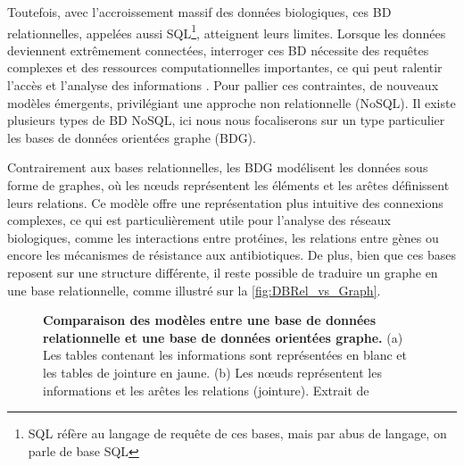 Toutefois, avec l’accroissement massif des données biologiques, ces BD relationnelles, appelées aussi SQL\footnote{SQL réfère au langage de requête de ces bases, mais par abus de langage, on parle de base SQL}, atteignent leurs limites. Lorsque les données deviennent extrêmement connectées, interroger ces BD nécessite des requêtes complexes et des ressources computationnelles importantes, ce qui peut ralentir l’accès et l’analyse des informations \cite{hsu_correlation_2014}. Pour pallier ces contraintes, de nouveaux modèles émergents, privilégiant une approche non relationnelle (NoSQL). Il existe plusieurs types de BD NoSQL, ici nous nous focaliserons sur un type particulier les bases de données orientées graphe (BDG).

Contrairement aux bases relationnelles, les BDG modélisent les données sous forme de graphes, où les n\oe uds représentent les éléments et les arêtes définissent leurs relations. Ce modèle offre une représentation plus intuitive des connexions complexes, ce qui est particulièrement utile pour l’analyse des réseaux biologiques, comme les interactions entre protéines, les relations entre gènes ou encore les mécanismes de résistance aux antibiotiques. De plus, bien que ces bases reposent sur une structure différente, il reste possible de traduire un graphe en une base relationnelle, comme illustré sur la \autoref{fig:DBRel_vs_Graph}.

\begin{figure}[htbp]
    \centering
    \hfill
    \caption[Comparaison des modèles entre une base de données relationnelle et une base de données orientées graphe]{\textbf{Comparaison des modèles entre une base de données relationnelle et une base de données orientées graphe.} (a) Les tables contenant les informations sont représentées en blanc et les tables de jointure en jaune. (b) Les n\oe uds représentent les informations et les arêtes les relations (jointure). Extrait de \cite{timon-reina_overview_2021}}
    \label{fig:DBRel_vs_Graph}
\end{figure}

